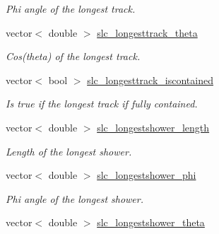 \begin{DoxyCompactItemize}
\begin{DoxyCompactList}\small\item\em Phi angle of the longest track. \end{DoxyCompactList}\item 
\hypertarget{classUBXSecEvent_aa3f16db3a887ed53354cae2bb3de19cb}{vector$<$ double $>$ \hyperlink{classUBXSecEvent_aa3f16db3a887ed53354cae2bb3de19cb}{slc\-\_\-longesttrack\-\_\-theta}}\label{classUBXSecEvent_aa3f16db3a887ed53354cae2bb3de19cb}

\begin{DoxyCompactList}\small\item\em Cos(theta) of the longest track. \end{DoxyCompactList}\item 
\hypertarget{classUBXSecEvent_a2e715c70dcf023fddf77ef56c85d01cf}{vector$<$ bool $>$ \hyperlink{classUBXSecEvent_a2e715c70dcf023fddf77ef56c85d01cf}{slc\-\_\-longesttrack\-\_\-iscontained}}\label{classUBXSecEvent_a2e715c70dcf023fddf77ef56c85d01cf}

\begin{DoxyCompactList}\small\item\em Is true if the longest track if fully contained. \end{DoxyCompactList}\item 
\hypertarget{classUBXSecEvent_aa94156d68649226c0251f379072f8fff}{vector$<$ double $>$ \hyperlink{classUBXSecEvent_aa94156d68649226c0251f379072f8fff}{slc\-\_\-longestshower\-\_\-length}}\label{classUBXSecEvent_aa94156d68649226c0251f379072f8fff}

\begin{DoxyCompactList}\small\item\em Length of the longest shower. \end{DoxyCompactList}\item 
\hypertarget{classUBXSecEvent_a5a3961829584867de2538496f6714f15}{vector$<$ double $>$ \hyperlink{classUBXSecEvent_a5a3961829584867de2538496f6714f15}{slc\-\_\-longestshower\-\_\-phi}}\label{classUBXSecEvent_a5a3961829584867de2538496f6714f15}

\begin{DoxyCompactList}\small\item\em Phi angle of the longest shower. \end{DoxyCompactList}\item 
\hypertarget{classUBXSecEvent_a92343d49ea8b95aebf4a8710b0caf8b1}{vector$<$ double $>$ \hyperlink{classUBXSecEvent_a92343d49ea8b95aebf4a8710b0caf8b1}{slc\-\_\-longestshower\-\_\-theta}}\label{classUBXSecEvent_a92343d49ea8b95aebf4a8710b0caf8b1}


\end{DoxyCompactItemize}
